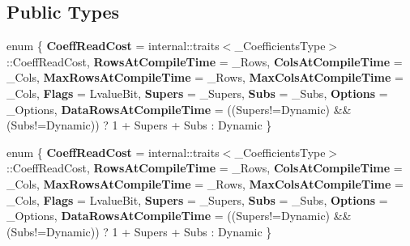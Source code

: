 \subsection*{Public Types}
\begin{DoxyCompactItemize}
\item 
\mbox{\label{struct_eigen_1_1internal_1_1traits_3_01_band_matrix_wrapper_3_01___coefficients_type_00_01___row768e2717402a9eceb38d536f65ceb4f1_accf35b3ac92464123c173ce044f48830}} 
enum \{ \newline
{\bfseries Coeff\+Read\+Cost} = internal\+:\+:traits$<$\+\_\+\+Coefficients\+Type$>$\+:\+:Coeff\+Read\+Cost, 
{\bfseries Rows\+At\+Compile\+Time} = \+\_\+\+Rows, 
{\bfseries Cols\+At\+Compile\+Time} = \+\_\+\+Cols, 
{\bfseries Max\+Rows\+At\+Compile\+Time} = \+\_\+\+Rows, 
\newline
{\bfseries Max\+Cols\+At\+Compile\+Time} = \+\_\+\+Cols, 
{\bfseries Flags} = Lvalue\+Bit, 
{\bfseries Supers} = \+\_\+\+Supers, 
{\bfseries Subs} = \+\_\+\+Subs, 
\newline
{\bfseries Options} = \+\_\+\+Options, 
{\bfseries Data\+Rows\+At\+Compile\+Time} = ((Supers!=Dynamic) \&\& (Subs!=Dynamic)) ? 1 + Supers + Subs \+: Dynamic
 \}
\item 
\mbox{\label{struct_eigen_1_1internal_1_1traits_3_01_band_matrix_wrapper_3_01___coefficients_type_00_01___row768e2717402a9eceb38d536f65ceb4f1_a6e261068c6fcdb351cb552fc853b7a20}} 
enum \{ \newline
{\bfseries Coeff\+Read\+Cost} = internal\+:\+:traits$<$\+\_\+\+Coefficients\+Type$>$\+:\+:Coeff\+Read\+Cost, 
{\bfseries Rows\+At\+Compile\+Time} = \+\_\+\+Rows, 
{\bfseries Cols\+At\+Compile\+Time} = \+\_\+\+Cols, 
{\bfseries Max\+Rows\+At\+Compile\+Time} = \+\_\+\+Rows, 
\newline
{\bfseries Max\+Cols\+At\+Compile\+Time} = \+\_\+\+Cols, 
{\bfseries Flags} = Lvalue\+Bit, 
{\bfseries Supers} = \+\_\+\+Supers, 
{\bfseries Subs} = \+\_\+\+Subs, 
\newline
{\bfseries Options} = \+\_\+\+Options, 
{\bfseries Data\+Rows\+At\+Compile\+Time} = ((Supers!=Dynamic) \&\& (Subs!=Dynamic)) ? 1 + Supers + Subs \+: Dynamic
 \}
\item 

\end{DoxyCompactItemize}
